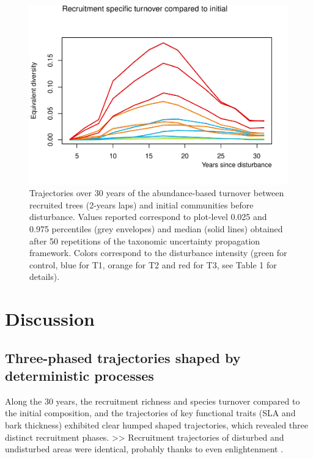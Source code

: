 \documentclass[fleqn,10pt]{ArtEcoFoG} %
\begin{document}
\begin{figure}

{\centering \includegraphics{RecruitmentTrajectories_files/figure-latex/Turnover-1} 

}

\caption{Trajectories over 30 years of the abundance-based turnover between recruited trees (2-years laps) and initial communities before disturbance. Values reported correspond to plot-level 0.025 and 0.975 percentiles (grey envelopes) and median (solid lines) obtained after 50 repetitions of the taxonomic uncertainty propagation framework. Colors correspond to the disturbance intensity (green for control, blue for T1, orange for T2 and red for T3, see Table 1 for details).}\label{fig:Turnover}
\end{figure}

\section{Discussion}\label{discussion}

\subsection{Three-phased trajectories shaped by deterministic
processes}\label{three-phased-trajectories-shaped-by-deterministic-processes}

Along the 30 years, the recruitment richness and species turnover
compared to the initial composition, and the trajectories of key
functional traits (SLA and bark thickness) exhibited clear humped shaped
trajectories, which revealed three distinct recruitment phases.
\textgreater{}\textgreater{} Recruitment trajectories of disturbed and
undisturbed areas were identical, probably thanks to even enlightenment
\citep{Dalling2002, Ruger2009}.
\end{document}
